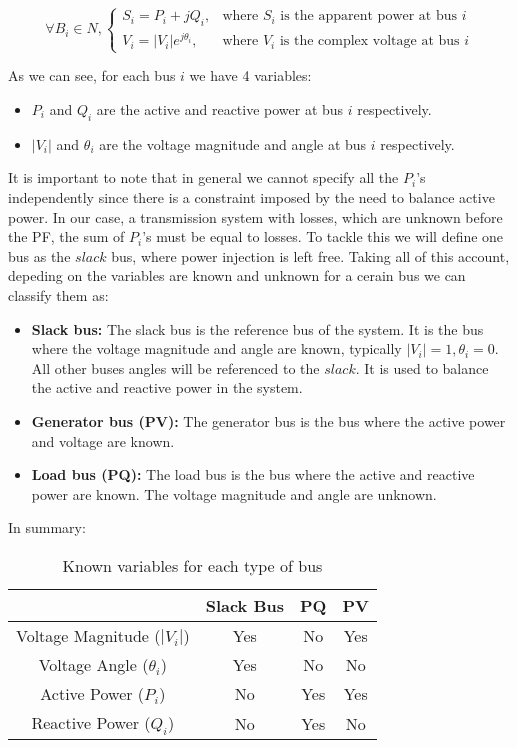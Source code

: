 \documentclass[a4paper,11pt, titlepage, twoside]{article}
\begin{document}
\begin{equation}
    \forall B_i \in N,
    \begin{cases}
        S_i = P_i + jQ_i, & \text{where } S_i \text{ is the apparent power at bus } i \\
        V_i = |V_i|e^{j\theta_i}, & \text{where } V_i \text{ is the complex voltage at bus } i
    \end{cases}
\end{equation}

As we can see, for each bus $i$ we have 4 variables:

\begin{itemize}
    \item $P_i$ and $Q_i$ are the active and reactive power at bus $i$ respectively.
    \item $|V_i|$ and $\theta_i$ are the voltage magnitude and angle at bus $i$ respectively.
\end{itemize}

It is important to note that in general we cannot specify all the $P_i$'s independently since there is a constraint imposed by the need to balance active power. In our case, a transmission system with losses, which are unknown before the PF,
the sum of $P_i$'s must be equal to losses. To tackle this we will define one bus as the $slack$ bus, where power injection is left free. Taking all of this account, depeding on the variables are known and unknown for a cerain bus we can classify them as:
\begin{itemize}
    \item \textbf{Slack bus:} The slack bus is the reference bus of the system. It is the bus where the voltage magnitude and angle are known, typically $|V_i|= 1, \theta_i= 0 $.
    All other buses angles will be referenced to the $slack$. It is used to balance the active and reactive power in the system.
    \item \textbf{Generator bus (PV):} The generator bus is the bus where the active power and voltage are known.
    \item \textbf{Load bus (PQ):} The load bus is the bus where the active and reactive power are known. The voltage magnitude and angle are unknown.
\end{itemize}
In summary:
\begin{table}[h]
    \centering
    \begin{tabular}{|c|c|c|c|}
        \hline
        & Slack Bus & PQ & PV \\
        \hline
        Voltage Magnitude ($|V_i|$) & Yes & No & Yes \\
        \hline
        Voltage Angle ($\theta_i$) & Yes & No & No \\
        \hline
        Active Power ($P_i$) & No & Yes & Yes \\
        \hline
        Reactive Power ($Q_i$) & No & Yes & No \\
        \hline
    \end{tabular}
    \caption{Known variables for each type of bus}
    \label{tab:bus_variables}
\end{table}
\end{document}
